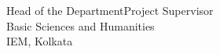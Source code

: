 {	\\[8\baselineskip]
	\fontsize{14pt}\selectfont
	\textunderscore\textunderscore\textunderscore\textunderscore\textunderscore\textunderscore\textunderscore\textunderscore\textunderscore\textunderscore\textunderscore\textunderscore\textunderscore\textunderscore\textunderscore\textunderscore\textunderscore\textunderscore\textunderscore\textunderscore\textunderscore\textunderscore\textunderscore\textunderscore\textunderscore\textunderscore\textunderscore\textunderscore\textunderscore
	\hfill
	\textunderscore\textunderscore\textunderscore\textunderscore\textunderscore\textunderscore\textunderscore\textunderscore\textunderscore\textunderscore\textunderscore\textunderscore\textunderscore\textunderscore\textunderscore\textunderscore\textunderscore\textunderscore\textunderscore\textunderscore\textunderscore\textunderscore\\
	\hspace*{2em}Head of the Department\hfill{}Project Supervisor\hspace*{1.5em}\\
	\hspace*{1em}Basic Sciences and Humanities\\
	\hspace*{4em}IEM, Kolkata\\
}
\usepackage{sectsty}
\sectionfont{\fontsize{24pt}{\baselineskip}\selectfont}
\subsectionfont{\fontsize{18pt}{\baselineskip}\selectfont}
